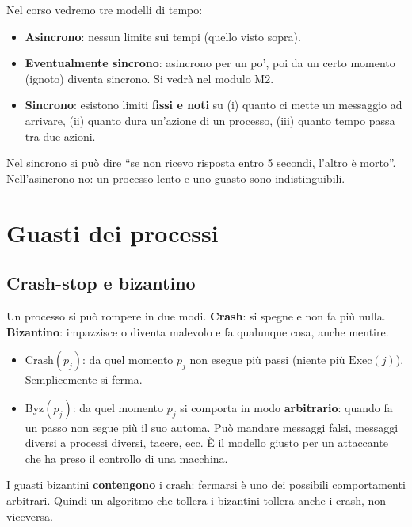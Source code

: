 Nel corso vedremo tre modelli di tempo:

\begin{itemize}
\tightlist
\item
  \textbf{Asincrono}: nessun limite sui tempi (quello visto sopra).
\item
  \textbf{Eventualmente sincrono}: asincrono per un po', poi da un certo momento (ignoto) diventa sincrono. Si vedrà nel modulo M2.
\item
  \textbf{Sincrono}: esistono limiti \textbf{fissi e noti} su (i) quanto ci mette un messaggio ad arrivare, (ii) quanto dura un'azione di un processo, (iii) quanto tempo passa tra due azioni.
\end{itemize}

Nel sincrono si può dire ``se non ricevo risposta entro 5 secondi, l'altro è morto''. Nell'asincrono no: un processo lento e uno guasto sono indistinguibili.

\section{Guasti dei processi}

\subsection{Crash-stop e bizantino}

\begin{inbreve}

Un processo si può rompere in due modi. \textbf{Crash}: si spegne e non fa più nulla. \textbf{Bizantino}: impazzisce o diventa malevolo e fa qualunque cosa, anche mentire.

\end{inbreve}

\begin{itemize}
\tightlist
\item
  \(\text{Crash}(p_j)\): da quel momento \(p_j\) non esegue più passi (niente più \(\text{Exec}(j)\)). Semplicemente si ferma.
\item
  \(\text{Byz}(p_j)\): da quel momento \(p_j\) si comporta in modo \textbf{arbitrario}: quando fa un passo non segue più il suo automa. Può mandare messaggi falsi, messaggi diversi a processi diversi, tacere, ecc. È il modello giusto per un attaccante che ha preso il controllo di una macchina.
\end{itemize}

I guasti bizantini \textbf{contengono} i crash: fermarsi è uno dei possibili comportamenti arbitrari. Quindi un algoritmo che tollera i bizantini tollera anche i crash, non viceversa.

